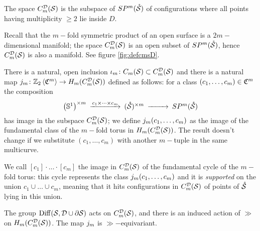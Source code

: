 % 
\begin{defn}
 \label{defn:cmsD}
 The space $C_{m}^{\mathcal{D}}(\mathcal{S})$ is the subspace of $SP^{m}(\mathring{\mathcal{S}})$ of configurations where all points
 having multiplicity $\geq 2$ lie inside $D$.
 
 Recall that the $m-$fold symmetric product of an open surface is a $2m-$dimensional manifold;
 the space $C_{m}^{\mathcal{D}}(\mathcal{S})$ is an open subset
 of $SP^m(\mathring{\mathcal{S}})$, hence $C_{m}^{\mathcal{D}}(\mathcal{S})$ is also a manifold.
 See figure \ref{fig:defcmsD}.
 
 There is a natural, open inclusion $\iota_m\colon C_m(\mathcal{S})\subset C_{m}^{\mathcal{D}}(\mathcal{S})$ and there is a natural map
  $j_m\colon \mathbb{Z}_2\left<\mathfrak{C}^{m}\right>\to H_m(C_{m}^{\mathcal{D}}(\mathcal{S}))$ defined as follows: for a class $(c_1,\dots,c_m)\in\mathfrak{C}^m$
  the composition
  \[
   \begin{CD}
    \pa{\Sone}^{\times m} @>c_1\times\dots\times c_m >> (\mrS)^{\times m} @>>> \SP^m(\mrS)
   \end{CD}
  \]
has image in the subspace $C_{m}^{\mathcal{D}}(\mathcal{S})$; we define $j_m(c_1,\dots,c_m)$ as the image
of the fundamental class
of the $m-$fold torus in $H_m(C_{m}^{\mathcal{D}}(\mathcal{S}))$. The result doesn't change
if we substitute $(c_1,\dots,c_m)$ with another $m-$tuple in the same multicurve.

We call $[c_1]\cdot\ldots\cdot[c_m]$ the image in $C_{m}^{\mathcal{D}}(\mathcal{S})$ of the fundamental cycle of the
$m-$fold torus: this cycle represents the class $j_m(c_1,\dots,c_m)$ and it is \emph{supported}
on the union $c_1\cup\dots\cup c_m$, meaning that it hits configurations in $C_{m}^{\mathcal{D}}(\mathcal{S})$ of points of $\mathring{\mathcal{S}}$
lying in this union.

The group $\operatorname{Diff}(\mathcal{S},\mathcal{D}\cup\partial\mathcal{S})$ acts on $C_{m}^{\mathcal{D}}(\mathcal{S})$, and there is an induced action of $\gg$
on $H_m(C_{m}^{\mathcal{D}}(\mathcal{S}))$. The map $j_m$ is $\gg-$equivariant.
\end{defn}

